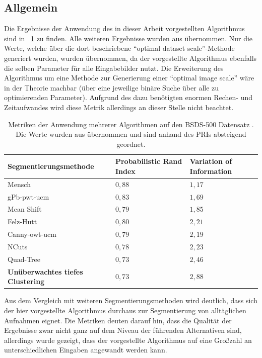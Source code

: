 \subsection{Allgemein}
\label{ssec:comparison_general}

Die Ergebnisse der Anwendung des in dieser Arbeit vorgestellten Algorithmus sind in \tablename~\ref{tab:res_bsds500} zu finden. Alle weiteren Ergebnisse wurden aus \cite{arbelaez_10} übernommen. Nur die Werte, welche über die dort beschriebene \enquote{optimal dataset scale}-Methode generiert wurden, wurden übernommen, da der vorgestellte Algorithmus ebenfalls die selben Parameter für alle Eingabebilder nutzt. Die Erweiterung des Algorithmus um eine Methode zur Generierung einer \enquote{optimal image scale} wäre in der Theorie machbar (\bspw über eine jeweilige binäre Suche über alle zu optimierenden Parameter). Aufgrund des dazu benötigten enormen Rechen- und Zeitaufwandes wird diese Metrik allerdings an dieser Stelle nicht beachtet.

\begin{table}[h!]
	\begin{tabularx}{\textwidth}{p{} >{\centering} p{} >{\centering\arraybackslash} p{}}
		\toprule
		\textbf{Segmentierungsmethode} & \textbf{Probabilistic Rand Index} & \textbf{Variation of Information} \\
		\midrule
		Mensch \cite{bsd500} & $0,88$ & $1,17$ \\
		\midrule
		gPb-pwt-ucm \cite{arbelaez_10} & $0,83$ & $1,69$ \\
		Mean Shift \cite{comaniciu_02} & $0,79$ & $1,85$ \\
		Felz-Hutt \cite{felzenszwalb_04} & $0,80$ & $2,21$ \\
		Canny-owt-ucm \cite{arbelaez_10} & $0,79$ & $2,19$ \\
		NCuts \cite{cour_05} & $0,78$ & $2,23$ \\
		Quad-Tree & $0,73$ & $2,46$ \\
		\textbf{Unüberwachtes tiefes Clustering} & $0,73$ & $2,88$ \\
		\bottomrule
	\end{tabularx}
	\caption{Metriken der Anwendung mehrerer Algorithmen auf den BSDS-500 Datensatz \cite{bsd500}. Die Werte wurden aus \cite{arbelaez_10} übernommen und sind anhand des PRIs absteigend geordnet.}
	\label{tab:res_bsds500}
\end{table}

Aus dem Vergleich mit weiteren Segmentierungsmethoden wird deutlich, dass sich der hier vorgestellte Algorithmus durchaus zur Segmentierung von alltäglichen Aufnahmen eignet. Die Metriken deuten darauf hin, dass die Qualität der Ergebnisse zwar nicht ganz auf dem Niveau der führenden Alternativen sind, allerdings wurde gezeigt, dass der vorgestellte Algorithmus auf eine Großzahl an unterschiedlichen Eingaben angewandt werden kann.

